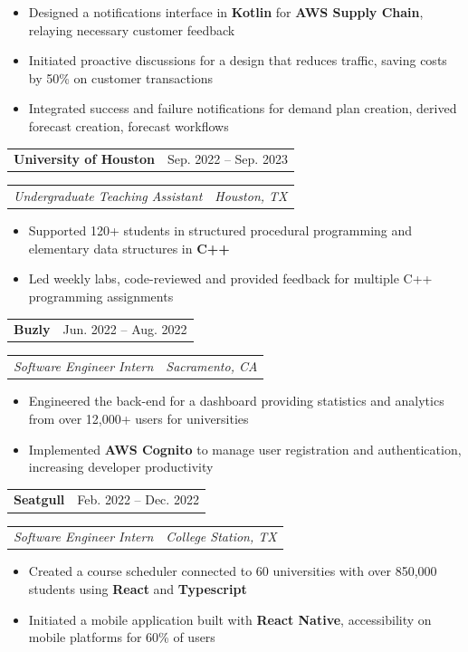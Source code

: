 \documentclass[10pt,letterpaper]{article}
\makeatletter
\newcommand{\resumeHeading}[2]{%
    \noindent
    \begin{tabular*}{\textwidth}
        {@{}l@{\extracolsep{\fill}}r@{}}
        \textbf{#1} & #2
    \end{tabular*}%
}
\newcommand{\resumeSubheading}[2]{%
    \noindent
    \begin{tabular*}{\textwidth}
        {@{}l@{\extracolsep{\fill}}r@{}}
        \textit{#1} & \textit{#2}
    \end{tabular*}%
}
\newcommand{\resumeEntry}[4]{%
    \resumeHeading{#1}{#2}\par
    \resumeSubheading{#3}{#4}\par
}
\newcommand{\resumeBulletsStart}{%
    \begin{itemize}
}
\newcommand{\resumeBulletsEnd}{%
    \end{itemize}
}
\makeatother
\begin{document}
\resumeBulletsStart
    \item Designed a notifications interface in \textbf{Kotlin} for \textbf{AWS Supply Chain}, relaying necessary customer feedback
    \item Initiated proactive discussions for a design that reduces traffic, saving costs by 50\% on customer transactions
    \item Integrated success and failure notifications for demand plan creation, derived forecast creation, forecast workflows
\resumeBulletsEnd

\vspace{5pt}

\resumeEntry
    {University of Houston}
    {Sep. 2022 -- Sep. 2023}
    {Undergraduate Teaching Assistant}
    {Houston, TX}

\resumeBulletsStart
    \item Supported 120+ students in structured procedural programming and elementary data structures in \textbf{C++}
    \item Led weekly labs, code-reviewed and provided feedback for multiple C++ programming assignments
\resumeBulletsEnd

\vspace{5pt}

\resumeEntry
    {Buzly}
    {Jun. 2022 -- Aug. 2022}
    {Software Engineer Intern}
    {Sacramento, CA}

\resumeBulletsStart
    \item Engineered the back-end for a dashboard providing statistics and analytics from over 12,000+ users for universities
    \item Implemented \textbf{AWS Cognito} to manage user registration and authentication, increasing developer productivity
\resumeBulletsEnd

\vspace{5pt}

\resumeEntry
    {Seatgull}
    {Feb. 2022 -- Dec. 2022}
    {Software Engineer Intern}
    {College Station, TX}

\resumeBulletsStart
    \item Created a course scheduler connected to 60 universities with over 850,000 students using \textbf{React} and \textbf{Typescript}
    \item Initiated a mobile application built with \textbf{React Native}, accessibility on mobile platforms for 60\% of users
\resumeBulletsEnd

\end{document}
